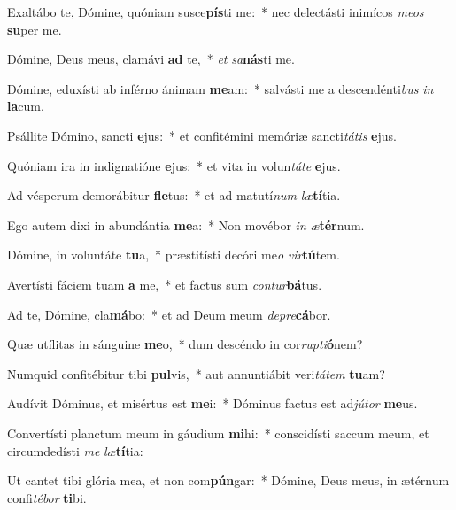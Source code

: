 \item Exaltábo te, Dómine, quóniam susce\textbf{pís}ti me:~* nec delectásti inimícos \textit{me}\textit{os} \textbf{su}per me.
\item Dómine, Deus meus, clamávi \textbf{ad} te,~* \textit{et} \textit{sa}\textbf{nás}ti me.
\item Dómine, eduxísti ab inférno ánimam \textbf{me}am:~* salvásti me a descendénti\textit{bus} \textit{in} \textbf{la}cum.
\item Psállite Dómino, sancti \textbf{e}jus:~* et confitémini memóriæ sancti\textit{tá}\textit{tis} \textbf{e}jus.
\item Quóniam ira in indignatióne \textbf{e}jus:~* et vita in volun\textit{tá}\textit{te} \textbf{e}jus.
\item Ad vésperum demorábitur \textbf{fle}tus:~* et ad matutí\textit{num} \textit{læ}\textbf{tí}tia.
\item Ego autem dixi in abundántia \textbf{me}a:~* Non movébor \textit{in} \textit{æ}\textbf{tér}num.
\item Dómine, in voluntáte \textbf{tu}a,~* præstitísti decóri me\textit{o} \textit{vir}\textbf{tú}tem.
\item Avertísti fáciem tuam \textbf{a} me,~* et factus sum \textit{con}\textit{tur}\textbf{bá}tus.
\item Ad te, Dómine, cla\textbf{má}bo:~* et ad Deum meum \textit{de}\textit{pre}\textbf{cá}bor.
\item Quæ utílitas in sánguine \textbf{me}o,~* dum descéndo in cor\textit{rup}\textit{ti}\textbf{ó}nem?
\item Numquid confitébitur tibi \textbf{pul}vis,~* aut annuntiábit veri\textit{tá}\textit{tem} \textbf{tu}am?
\item Audívit Dóminus, et misértus est \textbf{me}i:~* Dóminus factus est ad\textit{jú}\textit{tor} \textbf{me}us.
\item Convertísti planctum meum in gáudium \textbf{mi}hi:~* conscidísti saccum meum, et circumdedísti \textit{me} \textit{læ}\textbf{tí}tia:
\item Ut cantet tibi glória mea, et non com\textbf{pún}gar:~* Dómine, Deus meus, in ætérnum confi\textit{té}\textit{bor} \textbf{ti}bi.
